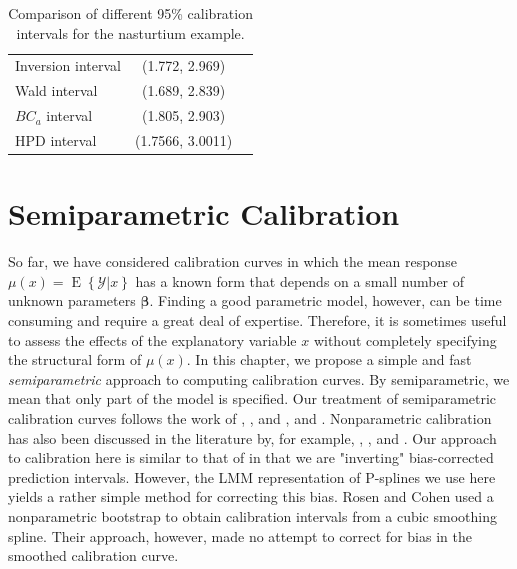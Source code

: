 \documentclass[cmfont,usenames,dvipsnames,leqno]{afit-etd}\usepackage[]{graphicx}\usepackage[]{color}
\newcommand{\mc}[1]{\ensuremath{\mathcal{#1}}}
\newcommand{\E}{\operatorname{E}}
\begin{document}
\begin{table}
  \begin{center}
     \begin{tabular}{lcc}
       \toprule
       Inversion interval & (1.772, 2.969) \\ 
       Wald interval      & (1.689, 2.839) \\ 
       $BC_a$ interval    & (1.805, 2.903) \\ 
       HPD interval       & (1.7566, 3.0011) \\ 
       \bottomrule
     \end{tabular}
   \end{center}
   \caption[ 95\% calibration intervals for the nasturtium data]{Comparison of different 95\% calibration intervals for the nasturtium example. \label{tab:results}}
 \end{table}





\chapter{Semiparametric Calibration}
\label{chap:nonparametric}
So far, we have considered calibration curves in which the mean response $\mu(x) = \E\left\{\mc{Y} | x\right\}$ has a known form that depends on a small number of unknown parameters $\bm{\beta}$. Finding a good parametric model, however, can be time consuming and require a great deal of expertise. Therefore, it is sometimes useful to assess the effects of the explanatory variable $x$ without completely specifying the structural form of $\mu(x)$. In this chapter, we propose a simple and fast \textit{semiparametric} approach to computing calibration curves. By semiparametric, we mean that only part of the model is specified. Our treatment of semiparametric calibration curves follows the work of \citet{brumback_comment_1999}, \citet{ruppert_selecting_2002}, and \citet{ruppert_semiparametric_2003}, and \citet{crainiceanu_bayesian_2005}. Nonparametric calibration has also been discussed in the literature by, for example, \citet{clark_calibration_1979}, \citet{clark_calibration_1980}, and \citet{rosen_constructing_1995}. Our approach to calibration here is similar to that of \citet{clark_calibration_1980} in that we are "inverting" bias-corrected prediction intervals. However, the LMM representation of P-splines \citep{ruppert_semiparametric_2003} we use here yields a rather simple method for correcting this bias. Rosen and Cohen used a nonparametric bootstrap to obtain calibration intervals from a cubic smoothing spline. Their approach, however, made no attempt to correct for bias in the smoothed calibration curve.
\end{document}
